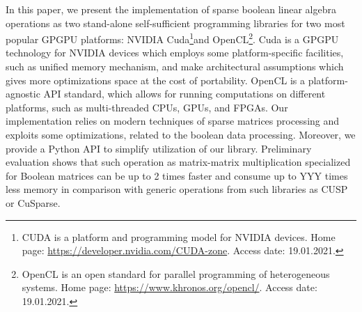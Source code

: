 In this paper, we present the implementation of sparse boolean linear algebra operations as two stand-alone self-sufficient programming libraries for two most popular GPGPU platforms: NVIDIA Cuda\footnote{CUDA is a platform and programming model for NVIDIA devices. Home page: \url{https://developer.nvidia.com/CUDA-zone}. Access date: 19.01.2021.}and OpenCL\footnote{OpenCL is an open standard for parallel programming of heterogeneous systems. Home page: \url{https://www.khronos.org/opencl/}. Access date: 19.01.2021.}.
Cuda is a GPGPU technology for NVIDIA devices which employs some platform-specific facilities, such as unified memory mechanism, and make architectural assumptions which gives more optimizations space at the cost of portability.
OpenCL is a platform-agnostic API standard, which allows for running computations on different platforms, such as multi-threaded CPUs, GPUs, and FPGAs.
Our implementation relies on modern techniques of sparse matrices processing and exploits some optimizations, related to the boolean data processing.
Moreover, we provide a Python API to simplify utilization of our library.
Preliminary evaluation shows that such operation as matrix-matrix multiplication specialized for Boolean matrices can be up to 2 times faster and consume up to YYY times less memory in comparison with generic operations from such libraries as CUSP or CuSparse.